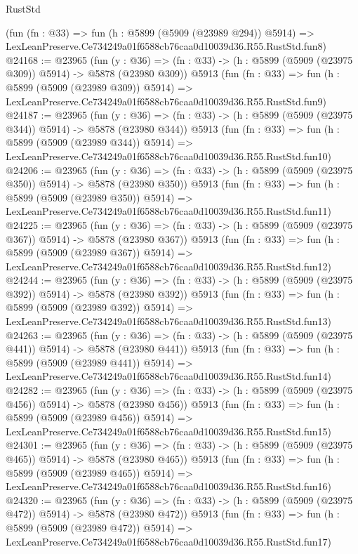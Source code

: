 \begin{lexlean}{RustStd}
\begin{coremodule}
{{    (fun (fn : @33) =>
    fun (h : @5899 (@5909 (@23989 @294)) @5914) =>
    LexLeanPreserve.Ce734249a01f6588cb76caa0d10039d36.R55.RustStd.fun8)
@24168 := @23965
    (fun (y : @36) => (fn : @33) -> (h : @5899 (@5909 (@23975 @309)) @5914) -> @5878 (@23980 @309))
    @5913
    (fun (fn : @33) =>
    fun (h : @5899 (@5909 (@23989 @309)) @5914) =>
    LexLeanPreserve.Ce734249a01f6588cb76caa0d10039d36.R55.RustStd.fun9)
@24187 := @23965
    (fun (y : @36) => (fn : @33) -> (h : @5899 (@5909 (@23975 @344)) @5914) -> @5878 (@23980 @344))
    @5913
    (fun (fn : @33) =>
    fun (h : @5899 (@5909 (@23989 @344)) @5914) =>
    LexLeanPreserve.Ce734249a01f6588cb76caa0d10039d36.R55.RustStd.fun10)
@24206 := @23965
    (fun (y : @36) => (fn : @33) -> (h : @5899 (@5909 (@23975 @350)) @5914) -> @5878 (@23980 @350))
    @5913
    (fun (fn : @33) =>
    fun (h : @5899 (@5909 (@23989 @350)) @5914) =>
    LexLeanPreserve.Ce734249a01f6588cb76caa0d10039d36.R55.RustStd.fun11)
@24225 := @23965
    (fun (y : @36) => (fn : @33) -> (h : @5899 (@5909 (@23975 @367)) @5914) -> @5878 (@23980 @367))
    @5913
    (fun (fn : @33) =>
    fun (h : @5899 (@5909 (@23989 @367)) @5914) =>
    LexLeanPreserve.Ce734249a01f6588cb76caa0d10039d36.R55.RustStd.fun12)
@24244 := @23965
    (fun (y : @36) => (fn : @33) -> (h : @5899 (@5909 (@23975 @392)) @5914) -> @5878 (@23980 @392))
    @5913
    (fun (fn : @33) =>
    fun (h : @5899 (@5909 (@23989 @392)) @5914) =>
    LexLeanPreserve.Ce734249a01f6588cb76caa0d10039d36.R55.RustStd.fun13)
@24263 := @23965
    (fun (y : @36) => (fn : @33) -> (h : @5899 (@5909 (@23975 @441)) @5914) -> @5878 (@23980 @441))
    @5913
    (fun (fn : @33) =>
    fun (h : @5899 (@5909 (@23989 @441)) @5914) =>
    LexLeanPreserve.Ce734249a01f6588cb76caa0d10039d36.R55.RustStd.fun14)
@24282 := @23965
    (fun (y : @36) => (fn : @33) -> (h : @5899 (@5909 (@23975 @456)) @5914) -> @5878 (@23980 @456))
    @5913
    (fun (fn : @33) =>
    fun (h : @5899 (@5909 (@23989 @456)) @5914) =>
    LexLeanPreserve.Ce734249a01f6588cb76caa0d10039d36.R55.RustStd.fun15)
@24301 := @23965
    (fun (y : @36) => (fn : @33) -> (h : @5899 (@5909 (@23975 @465)) @5914) -> @5878 (@23980 @465))
    @5913
    (fun (fn : @33) =>
    fun (h : @5899 (@5909 (@23989 @465)) @5914) =>
    LexLeanPreserve.Ce734249a01f6588cb76caa0d10039d36.R55.RustStd.fun16)
@24320 := @23965
    (fun (y : @36) => (fn : @33) -> (h : @5899 (@5909 (@23975 @472)) @5914) -> @5878 (@23980 @472))
    @5913
    (fun (fn : @33) =>
    fun (h : @5899 (@5909 (@23989 @472)) @5914) =>
    LexLeanPreserve.Ce734249a01f6588cb76caa0d10039d36.R55.RustStd.fun17)
}}
\end{coremodule}
\end{lexlean}
